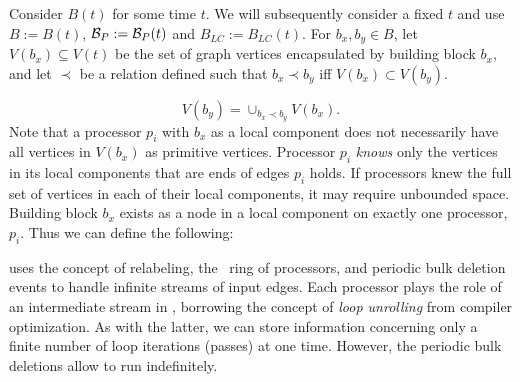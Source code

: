 Consider $B(t)$ for some time $t$. We  will subsequently consider a fixed $t$ and use $B:=B(t)$,  ${\cal B}_P :={\cal B}_P(t)$ and $B_{LC}:= B_{LC}(t)$. For $b_x, b_y \in B$, let $V(b_x) \subseteq V(t)$ be the set of graph vertices encapsulated by building block $b_x$, and let $\prec$ be a relation defined such that $b_x \prec b_y$  iff $V(b_x) \subset V(b_y)$.  

$$ V(b_y) = \cup_{b_x \prec b_y} V(b_x). $$
Note that a processor $p_i$ with $b_x$ as a local component does not necessarily have all vertices in $V(b_x)$ as primitive vertices. Processor $p_i$ \emph{knows} only the vertices in its local components that are ends of edges $p_i$ holds. If processors knew the full set of vertices in each of their local components, it may require unbounded space.
Building block $b_x$ exists as a node in a local component on exactly one processor, $p_i$. Thus we can define the following:
\fi

\XSCC uses the concept of relabeling, the \XStreamns \ ring
of processors, and periodic bulk deletion events to 
handle infinite streams of input edges. Each processor plays
the role of an intermediate stream in \WStreamns, borrowing the
concept of \emph{loop unrolling} from compiler optimization.  As
with the latter, we can store information concerning only a finite number of 
loop iterations (\WStream passes) at one time.  However, the periodic bulk 
deletions allow \XSCC to run indefinitely.
